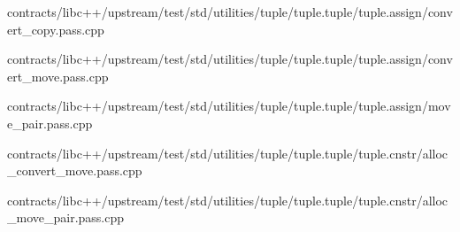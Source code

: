 \begin{DoxyCompactItemize}
contracts/libc++/upstream/test/std/utilities/tuple/tuple.\+tuple/tuple.\+assign/convert\+\_\+copy.\+pass.\+cpp\item 
contracts/libc++/upstream/test/std/utilities/tuple/tuple.\+tuple/tuple.\+assign/convert\+\_\+move.\+pass.\+cpp\item 
contracts/libc++/upstream/test/std/utilities/tuple/tuple.\+tuple/tuple.\+assign/move\+\_\+pair.\+pass.\+cpp\item 
contracts/libc++/upstream/test/std/utilities/tuple/tuple.\+tuple/tuple.\+cnstr/alloc\+\_\+convert\+\_\+move.\+pass.\+cpp\item 
contracts/libc++/upstream/test/std/utilities/tuple/tuple.\+tuple/tuple.\+cnstr/alloc\+\_\+move\+\_\+pair.\+pass.\+cpp\end{DoxyCompactItemize}
